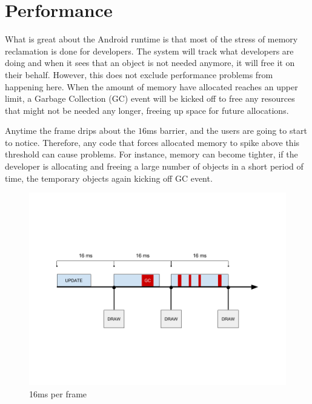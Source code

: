 \chapter{Performance}
\label{chapter-performance}

What is great about the Android runtime is that most of the stress of memory reclamation is done for developers. The system will track what developers are doing and when it sees that an object is not needed anymore, it will free it on their behalf. However, this does not exclude performance problems from happening here. When the amount of memory have allocated reaches an upper limit, a Garbage Collection (GC) event will be kicked off to free any resources that might not be needed any longer, freeing up space for future allocations. 

Anytime the frame drips about the $16$ms barrier, and the users are going to start to notice. Therefore, any code that forces allocated memory to spike above this threshold can cause problems. For instance, memory can become tighter, if the developer is allocating and freeing a large number of objects in a short period of time, the temporary objects again kicking off GC event. 

\begin{figure}[H]
\caption{16ms per frame}
\label{fig:16ms-per-frame}
\centering
\includegraphics[width=\textwidth, keepaspectratio]{Figures/16ms-per-frame.png}
\decoRule
\end{figure}

